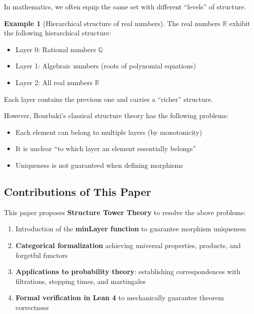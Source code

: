 \documentclass[11pt,a4paper]{article}
\theoremstyle{plain}
\theoremstyle{definition}
\newtheorem{example}[theorem]{Example}
\newcommand{\RR}{\mathbb{R}}
\newcommand{\QQ}{\mathbb{Q}}
\begin{document}
In mathematics, we often equip the same set with different ``levels'' of structure.

\begin{example}[Hierarchical structure of real numbers]
The real numbers $\RR$ exhibit the following hierarchical structure:
\begin{itemize}
  \item Layer 0: Rational numbers $\QQ$
  \item Layer 1: Algebraic numbers (roots of polynomial equations)
  \item Layer 2: All real numbers $\RR$
\end{itemize}
Each layer contains the previous one and carries a ``richer'' structure.
\end{example}

However, Bourbaki's classical structure theory has the following problems:
\begin{itemize}
  \item Each element can belong to multiple layers (by monotonicity)
  \item It is unclear ``to which layer an element essentially belongs''
  \item Uniqueness is not guaranteed when defining morphisms
\end{itemize}

\subsection{Contributions of This Paper}

This paper proposes \textbf{Structure Tower Theory} to resolve the above problems:

\begin{enumerate}[label=\textbf{(\roman*)}]
  \item Introduction of the \textbf{minLayer function} to guarantee morphism uniqueness
  \item \textbf{Categorical formalization} achieving universal properties, products, 
        and forgetful functors
  \item \textbf{Applications to probability theory}: establishing correspondences 
        with filtrations, stopping times, and martingales
  \item \textbf{Formal verification in Lean 4} to mechanically guarantee theorem correctness
\end{enumerate}

\end{document}

